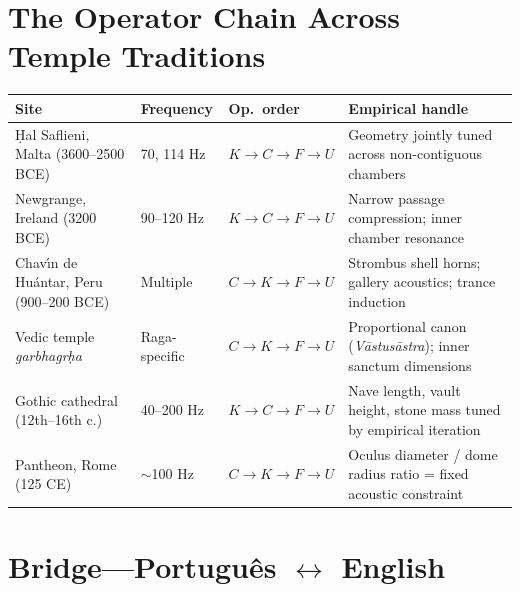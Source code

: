 \documentclass[11pt, twoside, openright]{book}
\theoremstyle{plain}
\theoremstyle{definition}
\begin{document}
\section{The Operator Chain Across Temple Traditions}

\begin{tabularx}{\textwidth}{@{}P{2cm}P{1.8cm}P{1.6cm}L@{}}
\toprule
\textbf{Site} & \textbf{Frequency} & \textbf{Op.\ order} &
\textbf{Empirical handle} \\
\midrule
\d{H}al Saflieni, Malta (3600--2500 BCE) &
  70, 114 Hz & $K\to C\to F\to U$ &
  Geometry jointly tuned across non-contiguous chambers \\[4pt]
Newgrange, Ireland (3200 BCE) &
  90--120 Hz & $K\to C\to F\to U$ &
  Narrow passage compression; inner chamber resonance \\[4pt]
Chav\'{\i}n de Hu\'antar, Peru (900--200 BCE) &
  Multiple & $C\to K\to F\to U$ &
  Strombus shell horns; gallery acoustics; trance induction \\[4pt]
Vedic temple \textit{garbhagr\d{h}a} &
  Raga-specific & $C\to K\to F\to U$ &
  Proportional canon (\textit{V\={a}stus\={a}stra}); inner sanctum dimensions \\[4pt]
Gothic cathedral (12th--16th c.) &
  40--200 Hz & $K\to C\to F\to U$ &
  Nave length, vault height, stone mass tuned by empirical iteration \\[4pt]
Pantheon, Rome (125 CE) &
  $\sim$100 Hz & $C\to K\to F\to U$ &
  Oculus diameter / dome radius ratio = fixed acoustic constraint \\
\bottomrule
\end{tabularx}

\section{Bridge---Portugu\^{e}s $\leftrightarrow$ English}
\end{document}
